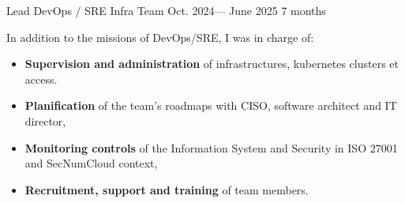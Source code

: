 \jobposition%
{Lead DevOps / SRE}%
{Infra Team}%
{Oct. 2024--- June 2025}%
{7 months}%
{
	In addition to the missions of DevOps/SRE, I was in charge of:

	\begin{itemize}
	  \item \textbf{Supervision and administration} of
	    infrastructures, kubernetes clusters et access.
		\item \textbf{Planification} of the team's roadmaps with CISO, software
		  architect and IT director,
		\item \textbf{Monitoring controls} of the Information System and Security in
		  ISO 27001 and SecNumCloud context,
		\item \textbf{Recruitment, support and training} of team members.
	\end{itemize}
}
